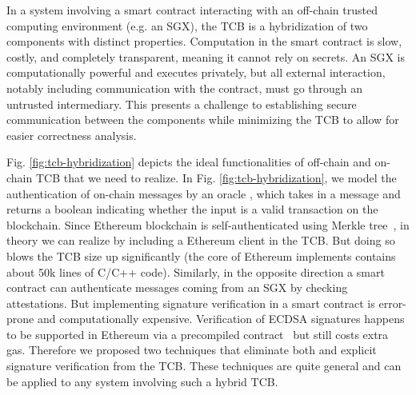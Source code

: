 In a system involving a smart contract interacting with an off-chain trusted computing environment (e.g. an SGX),
the TCB is a hybridization of two components with distinct properties.
Computation in the smart contract is slow, costly, and completely transparent, meaning it cannot rely on secrets.
An SGX is computationally powerful and executes privately, but all external interaction, notably including communication with the contract, must go through an untrusted intermediary.
This presents a challenge to establishing secure communication between the components while minimizing the TCB to allow for easier correctness analysis.


Fig. \ref{fig:tcb-hybridization} depicts the
ideal functionalities of off-chain and on-chain TCB that we need to realize.
In Fig. \ref{fig:tcb-hybridization}, we model the authentication of on-chain
messages by an oracle \oauth, which takes in a message
and returns a boolean indicating whether the input is a valid 
transaction on the blockchain.
Since Ethereum blockchain is self-authenticated using Merkle
tree~\cite{ethereum}, in theory we can realize \oauth
by including a Ethereum client in the TCB. But doing so blows the TCB size up 
significantly (the core of Ethereum implements contains about 50k lines of C/C++ code).
Similarly, in the opposite direction a smart contract can
authenticate messages coming from an SGX by checking 
attestations. But implementing
signature verification in a smart contract is error-prone and 
computationally expensive. Verification of ECDSA signatures
happens to be supported in Ethereum via a precompiled contract~\cite{ethereum}
but still costs extra gas.
Therefore we proposed two techniques that eliminate both \oauth
and explicit signature verification from the TCB. These techniques 
are quite general and can be applied to any system involving
such a hybrid TCB.

